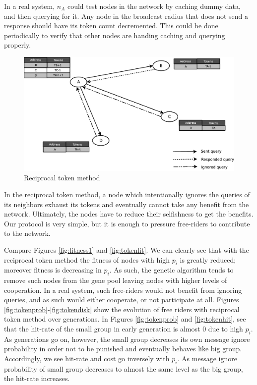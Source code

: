 \documentclass[12pt,journal,draftcls,letterpaper,onecolumn]{IEEEtran}
\begin{document}
In a real system, $n_A$ could test
nodes in the network by caching dummy data,
and then querying for it.  Any node in the broadcast radius that does not
send a response should have its token count decremented.  This could be done
periodically to verify that other nodes are handing caching and querying properly.

\begin{figure}
\centering
\includegraphics[width=5in]{token}
\caption{Reciprocal token method} 
\label{fig:token}
\end{figure}

In the reciprocal token method, a node which intentionally ignores the queries
of its neighbors exhaust its tokens and eventually cannot take any
benefit from the network. Ultimately, the nodes have to reduce their selfishness to get the
benefits. Our protocol is very simple, but it is enough to pressure free-riders to contribute to
the network.

Compare Figures \ref{fig:fitness1} and \ref{fig:tokenfit}.  We can
clearly see that with the reciprocal token method the fitness of nodes with
high $p_i$ is greatly reduced; moreover fitness is decreasing in $p_i$.
As such, the genetic algorithm tends to remove
such nodes from the gene pool leaving nodes with higher levels of cooperation.
In a real system, such free-riders would not benefit from ignoring queries,
and as such would either cooperate, or not participate at all.
Figures \ref{fig:tokenprob}-\ref{fig:tokendisk}
show the evolution of free riders with reciprocal token method over generations.
In Figures \ref{fig:tokenprob}
and \ref{fig:tokenhit}, see that the hit-rate of the 
small group in early generation is almost 0 due to high $p_i$.
As generations go on, however, the small group decreases its own message ignore
probability in order not to be punished and eventually behaves like big group.
Accordingly, we see hit-rate and cost go inversely with $p_i$.
As message ignore probability of small group decreases to almost the same
level as the big group, the hit-rate increases.
\end{document}
